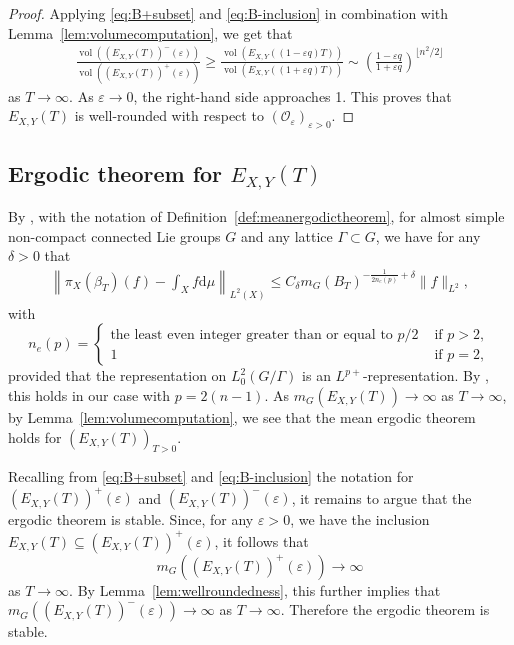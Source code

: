 \documentclass[11pt,reqno]{amsart}
\theoremstyle{definition}
\theoremstyle{remark}
\newcommand{\vol}{\operatorname{vol}}
\numberwithin{equation}{section}
\numberwithin{thm}{section}
\numberwithin{table}{section}
\begin{document}
\begin{proof}
Applying \eqref{eq:B+subset}
and \eqref{eq:B-inclusion} in combination with
Lemma~\ref{lem:volumecomputation}, we get that 
\begin{align*}
    \frac{\vol((E_{X,Y}(T))^{-}(\varepsilon))}{\vol((E_{X,Y}(T))^{+}(\varepsilon))} \ge \frac{\vol(E_{X,Y}((1-\varepsilon q)T))}{\vol(E_{X,Y}((1+\varepsilon q)T))} \sim \left(
    \frac{1-\varepsilon q}{1+\varepsilon q}
    \right)^{\lfloor n^2/2 \rfloor}
\end{align*}
as $T \to \infty$. As $\varepsilon \to 0$, the right-hand side approaches 1. This proves that $E_{X,Y}(T)$ is well-rounded with respect to $(\mathcal{O}_\varepsilon)_{\varepsilon>0}$.
 \end{proof}
\subsection{Ergodic theorem for $E_{X,Y}(T)$}\label{section:ergodic}
By \cite[Theorem~4.5 and Remark~4.6(ii)]{gorodnik_nevo}, with the notation of Definition~\ref{def:meanergodictheorem}, for almost simple non-compact connected Lie groups $G$ and any lattice $\Gamma \subset G$, we have for any $\delta>0$ that  
  \begin{align*}
           \left\|
           \pi_X(\beta_T)(f) -  
           \int_X
           f \mathrm{d} \mu
     \right\|_{L^2(X)} \le C_\delta m_G(B_T)^{-\frac{1}{2n_e(p)}+\delta} \|f\|_{L^2},
       \end{align*}
       with \[
       n_e(p)=
\begin{cases}
\text{the least even integer greater than or equal to }p/2 &\text{ if } p>2,\\
1 & \text{ if } p=2,
\end{cases}\]        
       provided that the representation on $L^2_0(G/\Gamma)$ is an $L^{p+}$-representation. By \cite[Example~4.3]{gorodnik_nevo}, this holds in our case with $p = 2(n-1)$. As $m_G(E_{X,Y}(T))\to \infty$ as $T \to \infty$, by Lemma~\ref{lem:volumecomputation}, we see that the mean ergodic theorem holds for $(E_{X,Y}(T))_{T>0}$. 
       
       Recalling from \eqref{eq:B+subset} and \eqref{eq:B-inclusion} the notation for 
       $(E_{X,Y}(T))^{+}(\varepsilon)$ and $(E_{X,Y}(T))^{-}(\varepsilon)$, it remains to argue that the ergodic theorem is stable. 
       Since, for any $\varepsilon>0$, we have the inclusion $E_{X,Y}(T) \subseteq (E_{X,Y}(T))^{+}(\varepsilon)$, it follows that \[
       m_G((E_{X,Y}(T))^{+}(\varepsilon)) \to \infty
       \] as $T \to \infty$. By Lemma~\ref{lem:wellroundedness}, this further implies that $m_G((E_{X,Y}(T))^{-}(\varepsilon)) \to \infty$ as $T \to \infty$. Therefore the ergodic theorem is stable.
\end{document}
